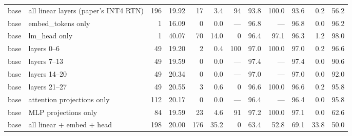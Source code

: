 \begin{tabular}{@{}l l r r r r r r r r r r@{}}
base & all linear layers (paper's INT4 RTN) & 196 & 19.92 & 17 & 3.4 & 94 & 93.8 & 100.0 & 93.6 & 0.2 & 56.2 \\
base & embed\_tokens only & 1 & 16.09 & 0 & 0.0 & --- & 96.8 & --- & 96.8 & 0.0 & 96.2 \\
base & lm\_head only & 1 & 40.07 & 70 & 14.0 & 0 & 96.4 & 97.1 & 96.3 & 1.2 & 98.0 \\
base & layers 0--6 & 49 & 19.20 & 2 & 0.4 & 100 & 97.0 & 100.0 & 97.0 & 0.2 & 96.6 \\
base & layers 7--13 & 49 & 19.59 & 0 & 0.0 & --- & 97.4 & --- & 97.4 & 0.0 & 90.6 \\
base & layers 14--20 & 49 & 20.34 & 0 & 0.0 & --- & 97.0 & --- & 97.0 & 0.0 & 92.0 \\
base & layers 21--27 & 49 & 20.55 & 3 & 0.6 & 0 & 96.6 & 100.0 & 96.6 & 0.2 & 95.8 \\
base & attention projections only & 112 & 20.17 & 0 & 0.0 & --- & 96.4 & --- & 96.4 & 0.0 & 95.8 \\
base & MLP projections only & 84 & 19.59 & 23 & 4.6 & 91 & 97.2 & 100.0 & 97.1 & 0.0 & 62.6 \\
base & all linear + embed + head & 198 & 20.00 & 176 & 35.2 & 0 & 63.4 & 52.8 & 69.1 & 33.8 & 50.0 \\
\bottomrule
\end{tabular}
